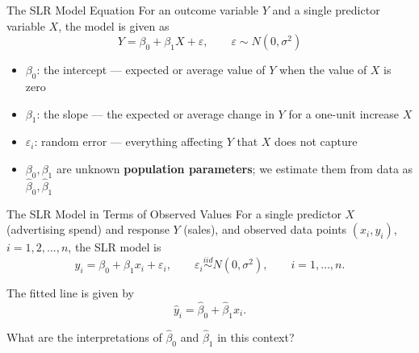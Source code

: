 \begin{frame}{The SLR Model Equation}
	For an outcome variable \(Y\) and a single predictor variable \(X\), the model is given as
	\[
		Y = \beta_0 + \beta_1 X + \varepsilon, \qquad \varepsilon \sim N(0, \sigma^2)
	\]

	\begin{itemize}
		\item $\beta_0$: the intercept --- expected or average value of \(Y\) when the value of \(X\) is zero
		\item $\beta_1$: the slope --- the expected or average change in \(Y\) for a one-unit increase \(X\)
		\item $\varepsilon_i$: random error --- everything affecting \(Y\) that \(X\) does not capture
		\item $\beta_0, \beta_1$ are unknown \textbf{population parameters}; we estimate them from data as $\hat\beta_0, \hat\beta_1$
	\end{itemize}
\end{frame}


\begin{frame}{The SLR Model in Terms of Observed Values}
	For a single predictor $X$ (advertising spend) and response $Y$ (sales), and observed data points \((x_i, y_i)\), \(i = 1, 2,...,n\), the SLR model is
	\[
	y_i = \beta_0 + \beta_1 x_i + \varepsilon_i, \qquad \varepsilon_i \overset{iid}{\sim} N(0, \sigma^2), \qquad i = 1, \dots, n.
	\]

	The fitted line is given by
	\[
		\hat{y}_i = \hat{\beta}_0 + \hat{\beta}_1 x_i.
	\]
	
	What are the interpretations of \(\hat{\beta}_0\) and \(\hat{\beta}_1\) in this context?


\end{frame}


